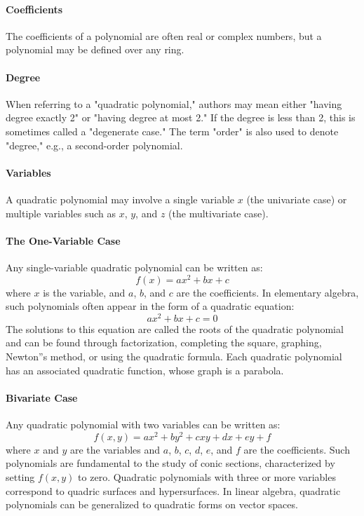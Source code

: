 \paragraph{Coefficients}

The coefficients of a polynomial are often real or complex numbers, but a polynomial may be defined over any ring.

\paragraph{Degree}

When referring to a "quadratic polynomial," authors may mean either "having degree exactly 2" or "having degree at most 2." If the degree is less than 2, this is sometimes called a "degenerate case." The term "order" is also used to denote "degree," e.g., a second-order polynomial.

\paragraph{Variables}

A quadratic polynomial may involve a single variable $x$ (the univariate case) or multiple variables such as $x$, $y$, and $z$ (the multivariate case).

\paragraph{The One-Variable Case}

Any single-variable quadratic polynomial can be written as:
$$
f(x) = ax^2 + bx + c
$$
where $x$ is the variable, and $a$, $b$, and $c$ are the coefficients. In elementary algebra, such polynomials often appear in the form of a quadratic equation:
$$
ax^2 + bx + c = 0
$$
The solutions to this equation are called the roots of the quadratic polynomial and can be found through factorization, completing the square, graphing, Newton''s method, or using the quadratic formula. Each quadratic polynomial has an associated quadratic function, whose graph is a parabola.

\paragraph{Bivariate Case}

Any quadratic polynomial with two variables can be written as:
$$
f(x, y) = ax^2 + by^2 + cxy + dx + ey + f
$$
where $x$ and $y$ are the variables and $a$, $b$, $c$, $d$, $e$, and $f$ are the coefficients. Such polynomials are fundamental to the study of conic sections, characterized by setting $f(x, y)$ to zero. Quadratic polynomials with three or more variables correspond to quadric surfaces and hypersurfaces. In linear algebra, quadratic polynomials can be generalized to quadratic forms on vector spaces.

